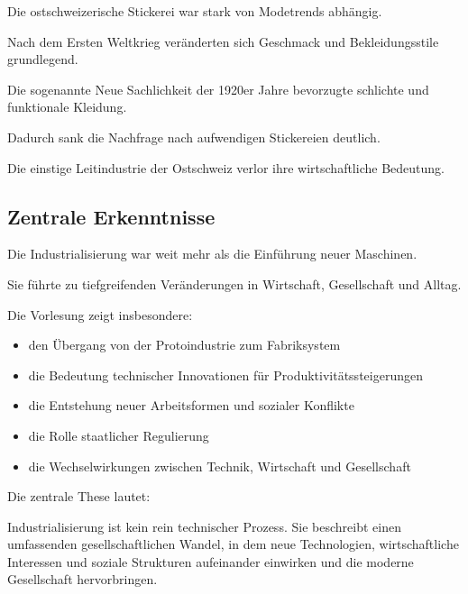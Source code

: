 Die ostschweizerische Stickerei war stark von Modetrends abhängig.

Nach dem Ersten Weltkrieg veränderten sich Geschmack
und Bekleidungsstile grundlegend.

Die sogenannte Neue Sachlichkeit der 1920er Jahre
bevorzugte schlichte und funktionale Kleidung.

Dadurch sank die Nachfrage nach aufwendigen Stickereien deutlich.

Die einstige Leitindustrie der Ostschweiz verlor ihre wirtschaftliche Bedeutung. 

\subsection{Zentrale Erkenntnisse}

Die Industrialisierung war weit mehr als die Einführung neuer Maschinen.

Sie führte zu tiefgreifenden Veränderungen in Wirtschaft,
Gesellschaft und Alltag.

Die Vorlesung zeigt insbesondere:

\begin{itemize}
    \item den Übergang von der Protoindustrie zum Fabriksystem
    \item die Bedeutung technischer Innovationen für Produktivitätssteigerungen
    \item die Entstehung neuer Arbeitsformen und sozialer Konflikte
    \item die Rolle staatlicher Regulierung
    \item die Wechselwirkungen zwischen Technik, Wirtschaft und Gesellschaft
\end{itemize}

Die zentrale These lautet:

Industrialisierung ist kein rein technischer Prozess.
Sie beschreibt einen umfassenden gesellschaftlichen Wandel,
in dem neue Technologien, wirtschaftliche Interessen und soziale Strukturen
aufeinander einwirken und die moderne Gesellschaft hervorbringen.